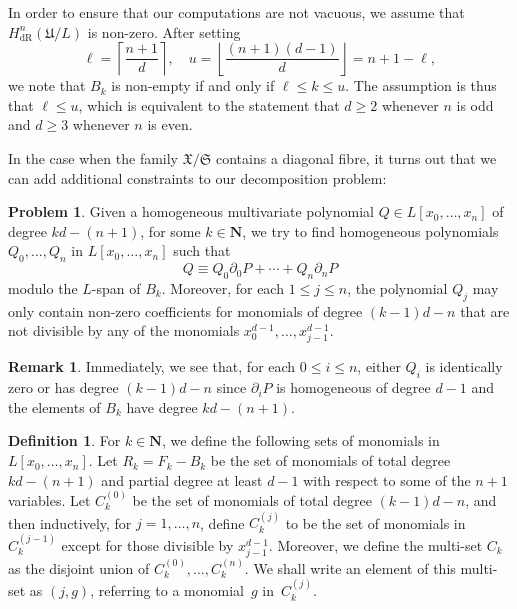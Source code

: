 \documentclass[a4paper,11pt]{article}
\numberwithin{equation}{section}
\providecommand{\floor}[1]{\left\lfloor#1\right\rfloor}   %
\providecommand{\ceil}[1]{\left\lceil#1\right\rceil}   %
\newcommand{\NN}{\mathbf{N}} %
\providecommand{\HdR}{H_{\text{dR}}}    %
\theoremstyle{definition}
\newtheorem{defn}[thm]{Definition}
\newtheorem{rem}[thm]{Remark}
\newtheorem{prob}[thm]{Problem}
\begin{document}
In order to ensure that our computations are not vacuous, we assume 
that $\HdR^n(\mathfrak{U}/L)$ is non-zero.  After setting 
\begin{equation}
\ell = \ceil{\frac{n+1}{d}}, \quad u = \floor{\frac{(n+1)(d-1)}{d}} = n+1 - \ell,
\end{equation}
we note that $B_k$ is non-empty if and only if $\ell \leq k \leq u$.  The 
assumption is thus that $\ell \leq u$, which is equivalent to the statement 
that $d \geq 2$ whenever $n$ is odd and $d \geq 3$ whenever $n$ is even.

In the case when the family $\mathfrak{X}/\mathfrak{S}$ contains a 
diagonal fibre, it turns out that we can add additional constraints 
to our decomposition problem:

\begin{prob} \label{prob:Decomposition}
Given a homogeneous multivariate polynomial $Q \in L[x_0, \dotsc, x_n]$ 
of degree \mbox{$k d - (n + 1)$}, for some $k \in \NN$, we try to find 
homogeneous polynomials $Q_0, \dotsc, Q_n$ in $L[x_0, \dotsc, x_n]$ such 
that 
\begin{equation} \label{eq:Decomposition}
Q \equiv Q_0 \partial_0 P + \dotsb + Q_n \partial_n P
\end{equation}
modulo the $L$-span of $B_k$.  Moreover, for each $1 \leq j \leq n$,  the 
polynomial $Q_j$ may only contain non-zero coefficients for monomials of 
degree $(k-1)d-n$ that are not divisible by any of the monomials 
$x_0^{d-1}, \dotsc, x_{j-1}^{d-1}$.
\end{prob}

\begin{rem}
Immediately, we see that, for each $0 \leq i \leq n$, either $Q_i$ is 
identically zero or has degree $(k - 1) d - n$ since $\partial_i P$ is 
homogeneous of degree $d - 1$ and the elements of $B_k$ have degree 
$kd - (n+1)$.
\end{rem}

\begin{defn} \label{defn:IndexSets}
For $k \in \NN$, we define the following sets of monomials in 
$L[x_0, \dotsc, x_n]$.  Let $R_k = F_k - B_k$ be the set of monomials of 
total degree $kd-(n+1)$ and partial degree at least $d-1$ with respect to some 
of the $n+1$ variables.  Let $C_k^{(0)}$ be the set of monomials of total 
degree $(k-1)d - n$, and then inductively, for $j = 1, \dotsc, n$, define 
$C_k^{(j)}$ to be the set of monomials in $C_k^{(j-1)}$ except for those 
divisible by $x_{j-1}^{d-1}$.  Moreover, we define the multi-set $C_k$ as 
the disjoint union of $C_k^{(0)}, \dotsc, C_k^{(n)}$.  We shall write an 
element of this multi-set as $(j, g)$, referring to a monomial~$g$ 
in~$C_k^{(j)}$.
\end{defn}
\end{document}
